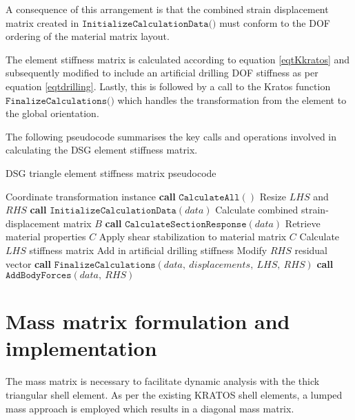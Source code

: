 A consequence of this arrangement is that the combined strain displacement matrix created in $\texttt{InitializeCalculationData()}$ must conform to the DOF ordering of the material matrix layout.

The element stiffness matrix is calculated according to equation \eqref{eqtKkratos} and subsequently modified to include an artificial drilling DOF stiffness as per equation \eqref{eqtdrilling}. Lastly, this is followed by a call to the Kratos function $\texttt{FinalizeCalculations()}$ which handles the transformation from the element to the global orientation.

The following pseudocode summarises the key calls and operations involved in calculating the DSG element stiffness matrix.

\begin{algorithm}
	\onehalfspacing
	\caption{DSG triangle element stiffness matrix pseudocode}\label{DSG triangle element stiffness matrix}
	\begin{algorithmic}[H]
		\Require Coordinate transformation instance
		\State \textbf{call} $\texttt{CalculateAll}()$
		\State Resize $LHS$ and $RHS$
		\State \textbf{call} $\texttt{InitializeCalculationData}(data)$
		\State \hspace{\algorithmicindent}Calculate combined strain-displacement matrix $B$
		\State \textbf{call} $\texttt{CalculateSectionResponse}(data)$
		\State \hspace{\algorithmicindent}Retrieve material properties $C$
		\State \hspace{\algorithmicindent}Apply shear stabilization to material matrix $C$
		\State Calculate $LHS$ stiffness matrix
		\State Add in artificial drilling stiffness
		\State Modify $RHS$ residual vector
		\State \textbf{call} $\texttt{FinalizeCalculations}(data,\ displacements,\ LHS,\ RHS)$
		\State \textbf{call} $\texttt{AddBodyForces}(data,\ RHS)$
	\end{algorithmic}
\end{algorithm}




\section{Mass matrix formulation and implementation}

The mass matrix is necessary to facilitate dynamic analysis with the thick triangular shell element. As per the existing KRATOS shell elements, a lumped mass approach is employed which results in a diagonal mass matrix.

